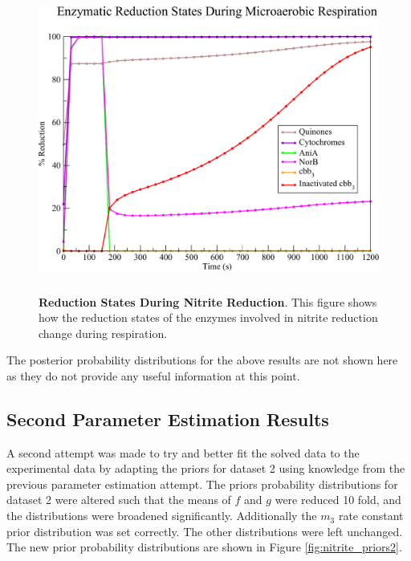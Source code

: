\begin{figure}[tbp]
 \centering
 \includegraphics[height=10cm, clip=true]{./07-nitritereduction/data/dataset2redox-1.pdf}
 \caption[Reduction States During Nitrite Reduction]{{\bf Reduction States During Nitrite Reduction}. This figure shows how the reduction states of the enzymes involved in nitrite reduction change during respiration.
  \label{fig:nitrite_ds2_redox1}}
\end{figure}

The posterior probability distributions for the above results are not shown here as they do not provide any useful information at this point.

\subsection{Second Parameter Estimation Results}
A second attempt was made to try and better fit the solved data to the experimental data by adapting the priors for dataset 2 using knowledge from the previous parameter estimation attempt. The priors probability distributions for dataset 2 were altered such that the means of $f$ and $g$ were reduced 10 fold, and the distributions were broadened significantly. Additionally the $m_3$ rate constant prior distribution was set correctly. The other distributions were left unchanged. The new prior probability distributions are shown in Figure \ref{fig:nitrite_priors2}.

